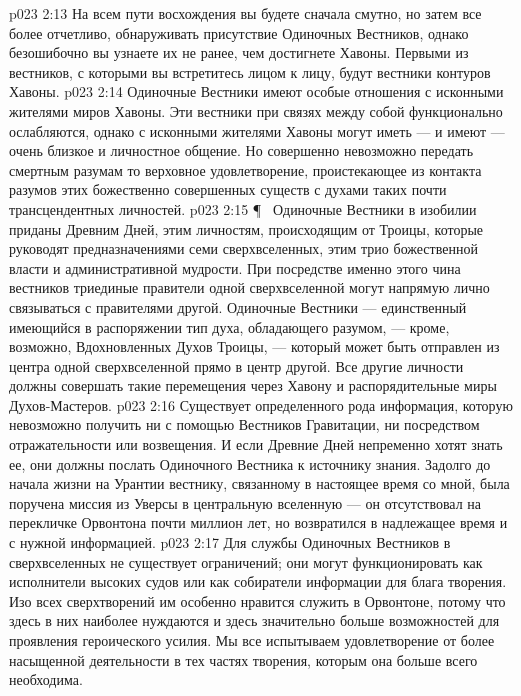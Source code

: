 \vs p023 2:13 \bibnobreakspace {} На всем пути восхождения вы будете сначала смутно, но затем все более отчетливо, обнаруживать присутствие Одиночных Вестников, однако безошибочно вы узнаете их не ранее, чем достигнете Хавоны. Первыми из вестников, с которыми вы встретитесь лицом к лицу, будут вестники контуров Хавоны.
\vs p023 2:14 Одиночные Вестники имеют особые отношения с исконными жителями миров Хавоны. Эти вестники при связях между собой функционально ослабляются, однако с исконными жителями Хавоны могут иметь --- и имеют --- очень близкое и личностное общение. Но совершенно невозможно передать смертным разумам то верховное удовлетворение, проистекающее из контакта разумов этих божественно совершенных существ с духами таких почти трансцендентных личностей.
\vs p023 2:15 \P\ \bibnobreakspace {} Одиночные Вестники в изобилии приданы Древним Дней, этим личностям, происходящим от Троицы, которые руководят предназначениями семи сверхвселенных, этим трио божественной власти и административной мудрости. При посредстве именно этого чина вестников триединые правители одной сверхвселенной могут напрямую лично связываться с правителями другой. Одиночные Вестники --- единственный имеющийся в распоряжении тип духа, обладающего разумом, --- кроме, возможно, Вдохновленных Духов Троицы, --- который может быть отправлен из центра одной сверхвселенной прямо в центр другой. Все другие личности должны совершать такие перемещения через Хавону и распорядительные миры Духов\hyp{}Мастеров.
\vs p023 2:16 Существует определенного рода информация, которую невозможно получить ни с помощью Вестников Гравитации, ни посредством отражательности или возвещения. И если Древние Дней непременно хотят знать ее, они должны послать Одиночного Вестника к источнику знания. Задолго до начала жизни на Урантии вестнику, связанному в настоящее время со мной, была поручена миссия из Уверсы в центральную вселенную --- он отсутствовал на перекличке Орвонтона почти миллион лет, но возвратился в надлежащее время и с нужной информацией.
\vs p023 2:17 Для службы Одиночных Вестников в сверхвселенных не существует ограничений; они могут функционировать как исполнители высоких судов или как собиратели информации для блага творения. Изо всех сверхтворений им особенно нравится служить в Орвонтоне, потому что здесь в них наиболее нуждаются и здесь значительно больше возможностей для проявления героического усилия. Мы все испытываем удовлетворение от более насыщенной деятельности в тех частях творения, которым она больше всего необходима.
